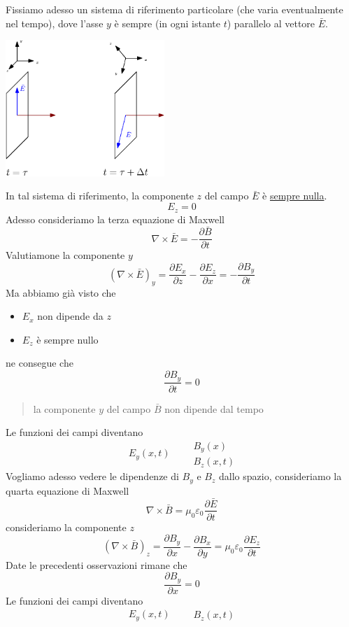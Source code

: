 \documentclass[10pt, letterpaper]{report}
\begin{document}
Fissiamo adesso un sistema di riferimento particolare (che varia eventualmente nel tempo), dove l'asse $y$ è sempre (in ogni istante $t$) parallelo al vettore $\bar E$.
\begin{center}
    \includegraphics[width=0.45\textwidth]{images/campoEProp.eps}
\end{center}
In tal sistema di riferimento, la componente $z$ del campo $\bar E$ è \underline{sempre nulla}.
$$ E_z=0$$
Adesso consideriamo la terza equazione di Maxwell
$$\nabla \times \bar E = -\dfrac{\partial \bar B }{\partial t}$$
Valutiamone la componente $y$
$$ (\nabla \times \bar E)_y=\frac{\partial E_x}{\partial z}-\frac{\partial E_z}{\partial x}=-\frac{\partial B_y}{\partial t}$$
Ma abbiamo già visto che \begin{itemize}
    \item $E_x$ non dipende da $z$ 
    \item $E_z$ è sempre nullo 
\end{itemize}
ne consegue che 
$$ \frac{\partial B_y}{\partial t}=0$$
\begin{quote}
    la componente $y$ del campo $\bar B$ non dipende dal tempo
\end{quote}
Le funzioni dei campi diventano
$$ \begin{matrix} 
    E_y(x,t) 
\end{matrix} \ \ \ \ \ \ \ \begin{matrix} 
    B_y(x)\\ 
    B_z(x,t)
\end{matrix}$$
Vogliamo adesso vedere le dipendenze di $B_y$ e $B_z$ dallo spazio, consideriamo la quarta equazione di Maxwell
$$ \nabla \times \bar B = \mu_0 \varepsilon_0 \dfrac{\partial \bar E}{\partial t}$$
consideriamo la componente $z$
$$(\nabla \times \bar B)_z=
\frac{\partial B_y}{\partial x}-\frac{\partial B_x}{\partial y}=\mu_0\varepsilon_0\frac{\partial E_z}{\partial t} $$
Date le precedenti osservazioni rimane che 
$$\frac{\partial B_y}{\partial x}=0$$
Le funzioni dei campi diventano
$$ \begin{matrix} 
    E_y(x,t) 
\end{matrix} \ \ \ \ \ \ \ \begin{matrix} 
    B_z(x,t)
\end{matrix}$$
\end{document}

